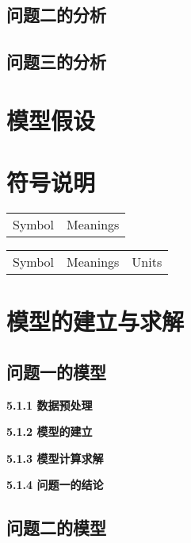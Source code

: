 \documentclass[]{article}   %
\begin{document}
		\subsection{问题二的分析}
		\subsection{问题三的分析}
	\section{模型假设}
		
	\section{符号说明}
		\begin{center}
			\begin{tabular}{cc}
				\hline
				\makebox[0.45\textwidth][c]{符号}	& \makebox[0.45\textwidth][c]{意义}   \\ \hline
				Symbol  & Meanings \\ \hline
			\end{tabular}
		\end{center}
	
		\begin{center}
			\begin{tabular}{ccc}
				\hline
				\makebox[0.25\textwidth][c]{符号}	& \makebox[0.35\textwidth][c]{意义} & \makebox[0.2\textwidth][c]{单位}	 \\ \hline
				Symbol  & Meanings & Units\\ \hline
			\end{tabular}
		\end{center}
\newpage
	\section{模型的建立与求解}
		\subsection{问题一的模型}
		
				\noindent\textbf{5.1.1 数据预处理}
				
				\noindent\textbf{5.1.2 模型的建立}
				
				\noindent\textbf{5.1.3 模型计算求解}
				
				\noindent\textbf{5.1.4 问题一的结论}
		\subsection{问题二的模型}
\end{document}
